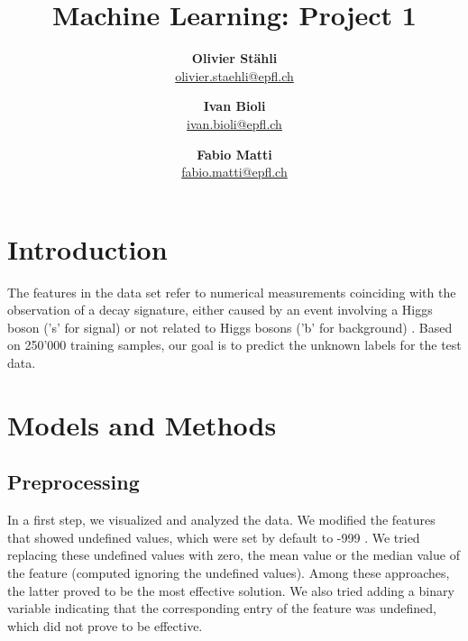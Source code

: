 \documentclass[11pt, a4paper, twocolumn]{article}
\title{\bfseries Machine Learning: Project 1}
\author{\textbf{Olivier Stähli} \\ \href{mailto:olivier.staehli@epfl.ch}{olivier.staehli@epfl.ch}
   \and \textbf{Ivan Bioli} \\ \href{mailto:ivan.bioli@epfl.ch}{ivan.bioli@epfl.ch}
   \and \textbf{Fabio Matti} \\ \href{mailto:fabio.matti@epfl.ch}{fabio.matti@epfl.ch}}
\date{}
\begin{document}

\section{Introduction}
\label{sec:introduction}

The features in the data set refer to numerical measurements coinciding with the observation of a decay signature, either caused by an event involving a Higgs boson ('s' for signal) or  not related to Higgs bosons ('b' for background) \cite{higgs2014}. Based on 250'000 training samples, our goal is to predict the unknown labels for the test data.

\section{Models and Methods}
\label{sec:models}

\subsection{Preprocessing}
\label{subsec:preprocessing}
In a first step, we visualized and analyzed the data. We modified the features that showed undefined values, which were set by default to -999 \cite{higgs2014}. We tried replacing these undefined values with zero, the mean value or the median value of the feature (computed ignoring the undefined values). Among these approaches, the latter proved to be the most effective solution. We also tried adding a binary variable indicating that the corresponding entry of the feature was undefined, which did not prove to be effective.
\end{document}
